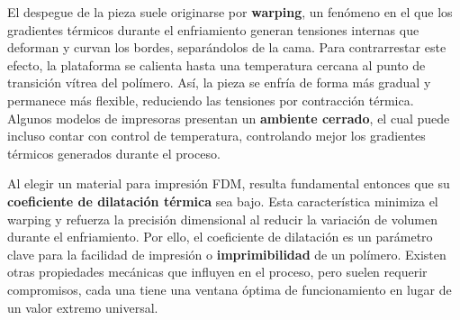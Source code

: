 El despegue de la pieza suele originarse por \textbf{warping}, un fenómeno en el que los gradientes térmicos durante el enfriamiento generan tensiones internas que deforman y curvan los bordes, separándolos de la cama. Para contrarrestar este efecto, la plataforma se calienta hasta una temperatura cercana al punto de transición vítrea del polímero. Así, la pieza se enfría de forma más gradual y permanece más flexible, reduciendo las tensiones por contracción térmica. Algunos modelos de impresoras presentan un \textbf{ambiente cerrado}, el cual puede incluso contar con control de temperatura, controlando mejor los gradientes térmicos generados durante el proceso.

Al elegir un material para impresión FDM, resulta fundamental entonces que su \textbf{coeficiente de dilatación térmica} sea bajo. Esta característica minimiza el warping y refuerza la precisión dimensional al reducir la variación de volumen durante el enfriamiento. Por ello, el coeficiente de dilatación es un parámetro clave para la facilidad de impresión o \textbf{imprimibilidad} de un polímero. Existen otras propiedades mecánicas que influyen en el proceso, pero suelen requerir compromisos, cada una tiene una ventana óptima de funcionamiento en lugar de un valor extremo universal.

